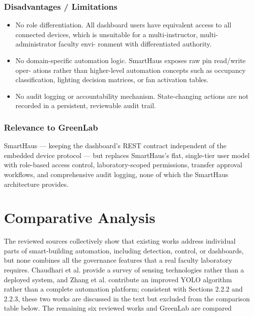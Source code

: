 \subsubsection*{Disadvantages / Limitations}



\begin{itemize}
  \item No role differentiation. All dashboard users have equivalent access to all connected
devices, which is unsuitable for a multi-instructor, multi-administrator faculty envi-
ronment with differentiated authority.
\end{itemize}

\begin{itemize}
  \item No domain-speciﬁc automation logic. SmartHaus exposes raw pin read/write oper-
ations rather than higher-level automation concepts such as occupancy classiﬁcation,
lighting decision matrices, or fan activation tables.
\end{itemize}

\begin{itemize}
  \item No audit logging or accountability mechanism. State-changing actions are not
recorded in a persistent, reviewable audit trail.
\end{itemize}



\subsubsection*{Relevance to GreenLab}

SmartHaus --- keeping the dashboard's REST contract independent of the embedded device
protocol --- but replaces SmartHaus's ﬂat, single-tier user model with role-based access
control, laboratory-scoped permissions, transfer approval workﬂows, and comprehensive
audit logging, none of which the SmartHaus architecture provides.



\section{Comparative Analysis}


The reviewed sources collectively show that existing works address individual parts of
smart-building automation, including detection, control, or dashboards, but none combines
all the governance features that a real faculty laboratory requires. Chaudhari et al. provide
a survey of sensing technologies rather than a deployed system, and Zhang et al. contribute
an improved YOLO algorithm rather than a complete automation platform; consistent with
Sections 2.2.2 and 2.2.3, these two works are discussed in the text but excluded from the
comparison table below. The remaining six reviewed works and GreenLab are compared

